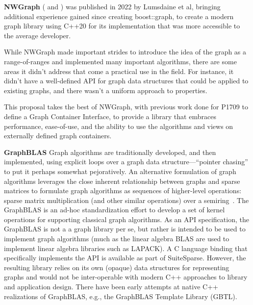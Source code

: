 \medskip

\textbf{NWGraph} (\cite{REF_nwgraph_library} and \cite{REF_nwgraph_paper}) was published in 2022
by Lumsdaine et al, bringing additional experience gained since creating boost::graph, to create a modern graph library using C++20 for its implementation 
that was more accessible to the average developer. %

While NWGraph made important strides to introduce the idea of the graph as a range-of-ranges and implemented many important algorithms,
there are some areas it didn't address that come a practical use in the field. For instance, it didn't have a well-defined API for graph
data structures that could be applied to existing graphs, and there wasn't a uniform approach to properties.

This proposal takes the best of NWGraph, with previous work done for P1709 to define a Graph Container Interface, to provide a library that
embraces performance, ease-of-use, and the ability to use the algorithms and views on externally defined graph containers.

\medskip

\textbf{GraphBLAS}
Graph algorithms are traditionally developed, and then implemented, using explicit loops
over a graph data structure---``pointer chasing'' to put it perhaps somewhat pejoratively.
An alternative formulation of graph algorithms leverages the close inherent relationship between
graphs and sparse matrices to formulate graph algorithms as sequences of higher-level operations:
sparse matrix multiplication (and other similar operations) over a semiring~\cite{kepner-gilbert}.
%
The GraphBLAS is an ad-hoc
standardization effort to develop a set of kernel operations for supporting classical
graph algorithms.  As an API specification, the GraphBLAS is not a a graph library per se, 
but rather is intended to be
used to implement graph algorithms (much as the linear algebra BLAS are used  to implement
linear algebra libraries such as LAPACK).
%
A C language binding that specifically implements the API is available as part of SuiteSparse.
However, the resulting library relies on its own (opaque) data structures for representing graphs
and would not be inter-operable with modern C++ approaches to library and application design.
There have been early attempts at native C++ realizations of GraphBLAS, e.g., the
GraphBLAS Template Library (GBTL).

